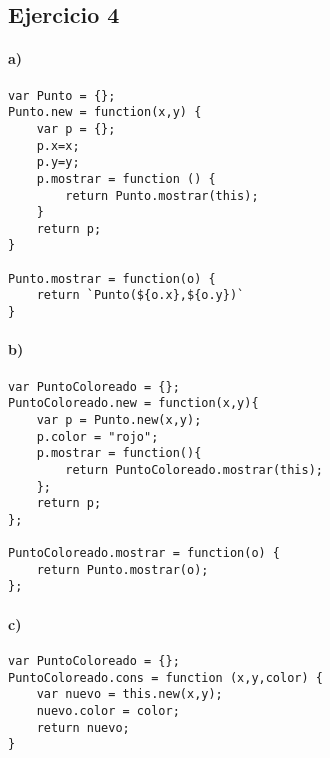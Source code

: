\documentclass[10pt,a4paper]{article}
\begin{document}
\newpage
\subsection{Ejercicio 4}
\paragraph{a)}
\begin{centrado}
\begin{verbatim}
var Punto = {};
Punto.new = function(x,y) {
    var p = {};
    p.x=x;
    p.y=y;
    p.mostrar = function () {
        return Punto.mostrar(this);
    }
    return p;
}

Punto.mostrar = function(o) {
    return `Punto(${o.x},${o.y})`    
}

\end{verbatim}
\end{centrado}
\paragraph{b)}
\begin{centrado}
\begin{verbatim}
var PuntoColoreado = {};
PuntoColoreado.new = function(x,y){
    var p = Punto.new(x,y);
    p.color = "rojo";
    p.mostrar = function(){ 
        return PuntoColoreado.mostrar(this);
    };
    return p;
};

PuntoColoreado.mostrar = function(o) { 
    return Punto.mostrar(o);
};
\end{verbatim}
\end{centrado}

\paragraph{c)}
\begin{centrado}
\begin{verbatim}
var PuntoColoreado = {};
PuntoColoreado.cons = function (x,y,color) {
    var nuevo = this.new(x,y);
    nuevo.color = color;
    return nuevo;
}
\end{verbatim}
\end{centrado}

\paragraph{}
%
%
%  
\end{document}
